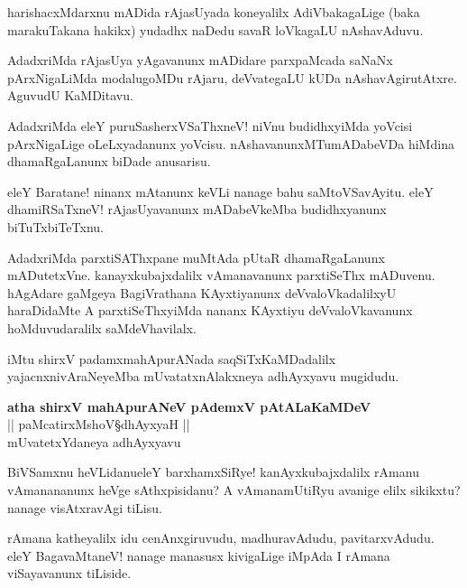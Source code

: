 \begin{mng}
harishacxMdarxnu mADida rAjasUyada koneyalilx AdiVbakagaLige (baka marakuTakana hakikx) yudadhx naDedu savaR loVkagaLU nAshavAduvu.
\end{mng}

\begin{mng}
AdadxriMda rAjasUya yAgavanunx mADidare parxpaMcada saNaNx pArxNigaLiMda modalugoMDu rAjaru, deVvategaLU kUDa nAshavAgirutAtxre. AguvudU KaMDitavu.
\end{mng}

\begin{mng}
AdadxriMda eleY puruSasherxVSaThxneV! niVnu budidhxyiMda yoVcisi pArxNigaLige oLeLxyadanunx yoVcisu. nAshavanunxMTumADabeVDa hiMdina dhamaRgaLanunx biDade anusarisu.
\end{mng}

\begin{mng}
eleY Baratane! ninanx mAtanunx keVLi nanage bahu saMtoVSavAyitu. eleY dhamiRSaTxneV! rAjasUyavanunx mADabeVkeMba budidhxyanunx biTuTxbiTeTxnu.
\end{mng}

\begin{mng}
AdadxriMda parxtiSAThxpane muMtAda pUtaR dhamaRgaLanunx mADutetxVne. kanayxkubajxdalilx vAmanavanunx parxtiSeThx mADuvenu. hAgAdare gaMgeya BagiVrathana KAyxtiyanunx deVvaloVkadalilxyU haraDidaMte A parxtiSeThxyiMda nananx KAyxtiyu deVvaloVkavanunx hoMduvudaralilx saMdeVhavilalx.
\end{mng}
iMtu shirxV padamxmahApurANada saqSiTxKaMDadalilx yajacnxnivAraNeyeMba mUvatatxnAlakxneya adhAyxyavu mugidudu.

\begin{center}
\textbf{\Large atha shirxV mahApurANeV pAdemxV pAtALaKaMDeV}\\
|| paMcatirxMshoV\S dhAyxyaH ||\\[20pt]
mUvatetxYdaneya adhAyxyavu
\end{center}

\begin{mng}
BiVSamxnu heVLidanu\mdash eleY barxhamxSiRye! kanAyxkubajxdalilx rAmanu vAmanananunx heVge sAthxpisidanu? A vAmanamUtiRyu avanige elilx sikikxtu? nanage visAtxravAgi tiLisu.
\end{mng}

\begin{mng}
rAmana katheyalilx idu cenAnxgiruvudu, madhuravAdudu, pavitarxvAdudu. eleY BagavaMtaneV! nanage manasusx kivigaLige iMpAda I rAmana viSayavanunx tiLiside.
\end{mng}

